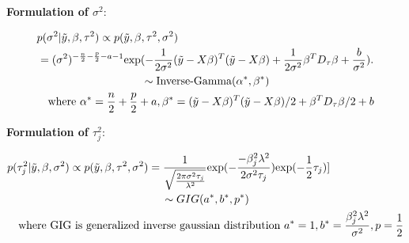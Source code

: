 \textbf{Formulation of $\sigma^2$}:

\begin{equation}
	\begin{multlined}
		p(\sigma^2|\tilde{y},\beta,\tau^2) \propto  	p(\tilde{y},\beta,\tau^2,\sigma^2)  \\
		= (\sigma^2)^{-\frac{n}{2}-\frac{p}{2}-a-1}\textnormal{exp}(-\frac{1}{2\sigma^2}(\tilde{y}-X\beta)^T(\tilde{y}-X\beta)+\frac{1}{2\sigma^2}\beta^TD_{\tau}\beta+\frac{b}{\sigma^2}).\\
		\sim \textnormal{Inverse-Gamma}(\alpha^*,\beta^*)\\
		\textnormal{where } \alpha^* = \frac{n}{2}+\frac{p}{2}+a, \beta^* = 
		(\tilde{y}-X\beta)^T(\tilde{y}-X\beta)/2 + \beta^TD_{\tau}\beta/2 +b
	\end{multlined}
\end{equation}

\textbf{Formulation of $\tau_j^2$}:

\begin{equation}
	\begin{multlined}
		p(\tau_j^2|\tilde{y},\beta,\sigma^2) \propto  	p(\tilde{y},\beta,\tau^2,\sigma^2)  
		= \frac{1}{\sqrt{\frac{2\pi\sigma^2\tau_j}{\lambda^2}}}\textnormal{exp}(-\frac{-\beta_j^2\lambda^2}{2\sigma^2\tau_j})\textnormal{exp}(-\frac{1}{2}\tau_j)]\\
		\sim GIG(a^*,b^*,p^*)\\
		\textnormal{where GIG is generalized inverse gaussian distribution } a^* = 1, b^* = \frac{\beta_j^2\lambda^2}{\sigma^2}, p = \frac{1}{2}
	\end{multlined}
\end{equation}

